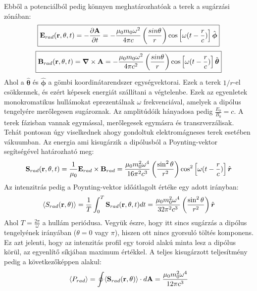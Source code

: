 \documentclass[a4paper,12pt]{article}
\begin{document}
Ebből a potenciálból pedig könnyen meghatározhatóak a terek a sugárzási zónában:
\begin{equation}
    \boxed{\bold{E}_{rad}(\bold{r}, \theta, t) = - \frac{\partial \bold{A}}{\partial t} = - \frac{\mu_0 m_0 \omega^2}{4 \pi c} \left(\frac{sin \theta}{r}\right) \cos \left[\omega (t - \frac{r}{c})\right] \hat{\boldsymbol{\phi}}}
\end{equation}
\begin{equation}
    \boxed{\bold{B}_{rad}(\bold{r}, \theta, t) = \boldsymbol{\nabla} \times \bold{A} = - \frac{\mu_0 m_0 \omega^2}{4 \pi c^2} \left(\frac{sin \theta}{r}\right) \cos \left[\omega (t - \frac{r}{c})\right] \hat{\boldsymbol{\theta}}}
\end{equation}
Ahol a $\hat{\boldsymbol{\theta}}$ és $\hat{\boldsymbol{\phi}}$ a gömbi koordinátarendszer egységvektorai. Ezek a terek $1/r$-el csökkennek, és ezért képesek energiát szállítani a végtelenbe.
Ezek az egyenletek monokromatikus hullámokat eprezentálnak $\omega$ frekvenciával, amelyek a dipólus tengelyére merőlegesen sugároznak. Az amplitúdóik hányadosa pedig $\frac{E_0}{B_0} = c$.
A terek fázisban vannak egymással, merőlegesek egymásra és transzverzálisak. Tehát pontosan úgy viselkednek ahogy gondoltuk elektromágneses terek esetében vákuumban. Az energia ami kisugárzik a dipólusból a Poynting-vektor segítségével határozható meg:
\begin{equation}
    \bold{S}_{rad}(\bold{r}, \theta, t) = \frac{1}{\mu_0} \bold{E}_{rad} \times \bold{B}_{rad} = \frac{\mu_0 m_0^2 \omega^4}{16 \pi^2 c^3} \left(\frac{\sin^2 \theta}{r^2}\right) \cos^2 \left[\omega (t - \frac{r}{c})\right] \hat{\boldsymbol{r}}
\end{equation}
Az intenzitrás pedig a Poynting-vektor időátlagolt értéke egy adott irányban:
\begin{equation}
    \langle S_{rad}(\bold{r}, \theta) \rangle = \frac{1}{T} \int_0^T \bold{S}_{rad}(\bold{r}, \theta, t) dt = \frac{\mu_0 m_0^2 \omega^4}{32 \pi^2 c^3} \left(\frac{\sin^2 \theta}{r^2}\right) \hat{\boldsymbol{r}}
\end{equation}
Ahol $T = \frac{2 \pi}{\omega}$ a hullám periódusa. Vegyük észre, hogy itt sincs sugárzás a dipólus tengelyének irányában ($\theta = 0$ vagy $\pi$), hiszen ott nincs gyorsuló töltés komponens.
Ez azt jelenti, hogy az intenzitás profil egy toroid alakú minta lesz a dipólus körül, az egyenlítő síkjában maximum értékkel.
A teljes kisugárzott teljesítmény pedig a következőképpen alakul:
\begin{equation}
    \langle P_{rad} \rangle = \oint \langle \bold{S}_{rad}(\bold{r}, \theta) \rangle \cdot d\bold{A} = \frac{\mu_0 m_0^2 \omega^4}{12 \pi c^3}
\end{equation}
\end{document}
